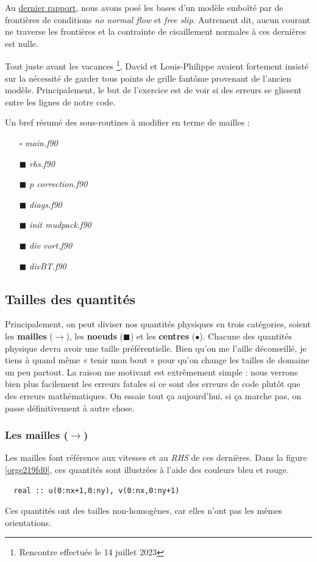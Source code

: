 \documentclass[10pt]{report}
\numberwithin{equation}{section}
\renewcommand{\boxtimes}{\blacksquare}
\begin{document}
Au \href{rapport-2023-07-07.org}{dernier rapport}, nous avons posé les bases d'un modèle emboîté par de frontières de conditions \emph{no normal flow} et \emph{free slip}.
Autrement dit, aucun courant ne traverse les frontières et la contrainte de cisaillement normales à ces dernières est nulle. \bigskip

Tout juste avant les vacances \footnote{Rencontre effectuée le 14 juillet 2023}, David et Louis-Philippe avaient fortement insisté sur la nécessité de garder tous points de grille fantôme provenant de l'ancien modèle.
Principalement, le but de l'exercice est de voir si des erreurs se glissent entre les lignes de notre code. \bigskip

Un bref résumé des sous-routines à modifier en terme de mailles : 
\begin{itemize}
\item[{$\square$}] \emph{main.f90}
\item[{$\boxtimes$}] \emph{rhs.f90}
\item[{$\boxtimes$}] \emph{p correction.f90}
\item[{$\boxtimes$}] \emph{diags.f90}
\item[{$\boxtimes$}] \emph{init mudpack.f90}
\item[{$\boxtimes$}] \emph{div vort.f90}
\item[{$\boxtimes$}] \emph{divBT.f90}
\end{itemize}


\subsection{Tailles des quantités}
\label{sec:orgd0dc480}
Principalement, on peut diviser nos quantités physiques en trois catégories, soient les \textbf{mailles} (\(\rightarrow\)), les \textbf{noeuds} (\(\blacksquare\)) et les \textbf{centres} (\(\bullet\)).
Chacune des quantités physique devra avoir une taille préférentielle.
Bien qu'on me l'aille déconseillé, je tiens à quand même « tenir mon bout » pour qu'on change les tailles de domaine un peu partout.
La raison me motivant est extrêmement simple : nous verrons bien plus facilement les erreurs fatales si ce sont des erreurs de code plutôt que des erreurs mathématiques.
On essaie tout ça aujourd'hui, si ça marche pas, on passe définitivement à autre chose.

\subsubsection{Les mailles (\(\rightarrow\))}
\label{sec:org8ad8803}
Les mailles font référence aux vitesses et au \emph{RHS} de ces dernières. 
Dans la figure \ref{orge219fd0}, ces quantités sont illustrées à l'aide des couleurs bleu et rouge.
\begin{verbatim}
  real :: u(0:nx+1,0:ny), v(0:nx,0:ny+1)
\end{verbatim}
Ces quantités ont des tailles non-homogènes, car elles n'ont pas les mêmes orientations.
\end{document}

